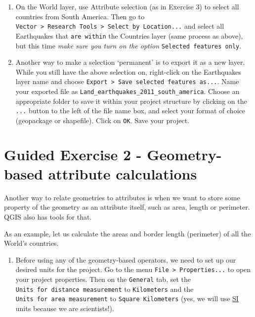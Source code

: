 \documentclass[
  letterpaper,
  DIV=11,
  numbers=noendperiod]{scrreprt}
\providecommand{\tightlist}{%
  \setlength{\itemsep}{0pt}\setlength{\parskip}{0pt}}\usepackage{longtable,booktabs,array}
\begin{document}
\begin{enumerate}
\def\labelenumi{(\arabic{enumi})}
\setcounter{enumi}{110}
\item
  On the World layer, use Attribute selection (as in Exercise 3) to
  select all countries from South America. Then go to
  \texttt{Vector\ \textgreater{}\ Research\ Tools\ \textgreater{}\ Select\ by\ Location...}
  and select all Earthquakes that \texttt{are\ within} the Countries
  layer (same process as above), but this time \emph{make sure you turn
  on the option} \texttt{Selected\ features\ only}.
\item
  Another way to make a selection `permanent' is to export it as a new
  layer. While you still have the above selection on, right-click on the
  Earthquakes layer name and choose
  \texttt{Export\ \textgreater{}\ Save\ selected\ features\ as...}. Name
  your exported file as
  \texttt{Land\_earthquakes\_2011\_south\_america}. Choose an
  appropriate folder to save it within your project structure by
  clicking on the \texttt{...} button to the left of the file name box,
  and select your format of choice (geopackage or shapefile). Click on
  \texttt{OK}. Save your project.
\end{enumerate}

\section{Guided Exercise 2 - Geometry-based attribute
calculations}\label{guided-exercise-2---geometry-based-attribute-calculations}

Another way to relate geometries to attributes is when we want to store
some property of the geometry as an attribute itself, such as area,
length or perimeter. QGIS also has tools for that.

As an example, let us calculate the areas and border length (perimeter)
of all the World's countries.

\begin{enumerate}
\def\labelenumi{(\arabic{enumi})}
\setcounter{enumi}{112}
\tightlist
\item
  Before using any of the geometry-based operators, we need to set up
  our desired units for the project. Go to the menu
  \texttt{File\ \textgreater{}\ Properties...} to open your project
  properties. Then on the \texttt{General} tab, set the
  \texttt{Units\ for\ distance\ measurement} to \texttt{Kilometers} and
  the \texttt{Units\ for\ area\ measurement} to
  \texttt{Square\ Kilometers} (yes, we will use
  \href{https://en.wikipedia.org/wiki/International_System_of_Units}{SI}
  units because we are scientists!).
\end{enumerate}
\end{document}
